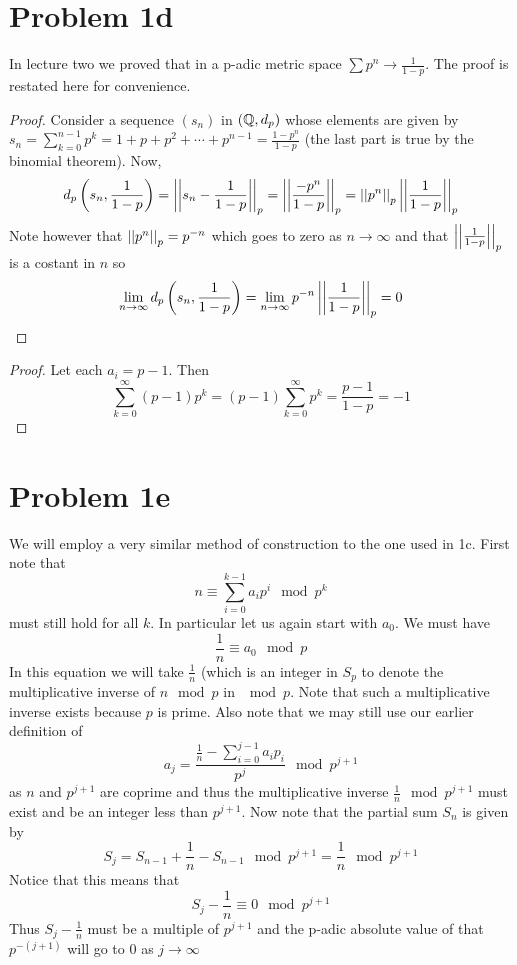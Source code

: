 \section*{Problem 1d}
\begin{lemma}
In lecture two we proved that in a p-adic metric space  $\sum p^n\to\frac{1}{1-p}$. The proof is restated here for convenience. 
\begin{proof}
Consider a sequence $(s_n)$ in $(\mathbb{Q},d_p)$ whose elements are given by $s_n=\sum\limits_{k=0}^{n-1} p^k=1+p+p^2+\cdots+p^{n-1}=\frac{1-p^n}{1-p}$ (the last part is true by the binomial theorem). Now,
\[ d_p\left(s_n,\dfrac{1}{1-p}\right)=\left|\left| s_n-\dfrac{1}{1-p} \right|\right|_p=\left|\left| \dfrac{-p^n}{1-p} \right|\right|_p=\left|\left| p^n \right|\right|_p\left|\left| \dfrac{1}{1-p} \right|\right|_p \]
Note however that $\left|\left| p^n \right|\right|_p=p^{-n}$ which goes to zero as $n\to\infty$ and that $\left|\left| \frac{1}{1-p} \right|\right|_p$ is a costant in $n$ so
\[ \lim\limits_{n\to\infty} d_p\left(s_n,\dfrac{1}{1-p}\right) = \lim\limits_{n\to\infty} p^{-n}\left|\left| \dfrac{1}{1-p} \right|\right|_p = 0 \]
\end{proof}
\end{lemma}
\begin{proof}
Let each $a_i = p-1$. Then
\[ \sum_{k=0}^\infty (p-1)p^k = (p-1) \sum_{k=0}^\infty p^k = \frac{p-1}{1-p} = -1 \]
\end{proof}
\section*{Problem 1e}
We will employ a very similar method of construction to the one used in 1c. First note that 
\[ n \equiv \sum\limits_{i=0}^{k-1} a_i p^i \mod{p^k} \]
must still hold for all $k$. In particular let us again start with $a_0$. We must have
\[ \frac{1}{n} \equiv a_0 \mod{p} \]
In this equation we will take $\frac{1}{n}$ (which is an integer in $S_p$ to denote the multiplicative inverse of $n \mod{p}$ in $\mod{p}$. Note that such a multiplicative inverse exists because $p$ is prime. Also note that we may still use our earlier definition of 
\[a_{j} = \dfrac{\frac{1}{n} - \sum\limits_{i=0}^{j-1} a_i p_i }{p^{j}} \mod{p^{j+1}} \]
as $n$ and $p^{j+1}$ are coprime and thus the multiplicative inverse $\frac{1}{n} \mod{p^{j+1}}$ must exist and be an integer less than $p^{j+1}$.
Now note that the partial sum $S_n$ is given by
\[ S_j = S_{n-1} + \frac{1}{n} - S_{n-1} \mod{p^{j+1}} = \frac{1}{n} \mod{p^{j+1}} \]
Notice that this means that 
\[S_j - \frac{1}{n} \equiv 0 \mod{p^{j+1}} \] 
Thus $S_j - \frac{1}{n}$ must be a multiple of $p^{j+1}$ and the p-adic absolute value of that $p^{-(j+1)}$ will go to 0 as $j\to\infty$
